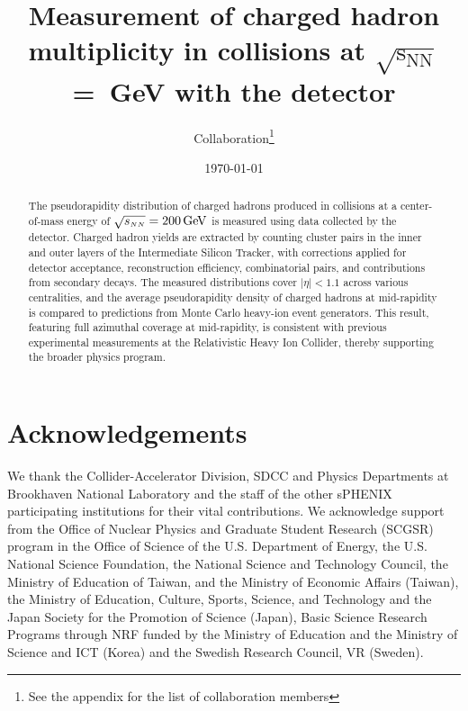 \documentclass[type=preprint,linenumbering=off]{sphenix}
\begin{document}


\title{Measurement of charged hadron multiplicity in \auau collisions at $\sqrt{\text{s}_{\text{NN}}}$\;=~GeV with the \sphenix detector}
\author{\sphenix Collaboration\footnote{See the appendix for the list of collaboration members}}
\date{\today}


\maketitle

\begin{abstract}
  The pseudorapidity distribution of charged hadrons produced in \auau collisions at a center-of-mass energy of $\mbox{$\sqrt{s_{\scriptscriptstyle NN}}$}=200\mathrm{\,Ge\kern -0.1em V}$ is measured using data collected by the \sphenix detector. Charged hadron yields are extracted by counting cluster pairs in the inner and outer layers of the Intermediate Silicon Tracker, with corrections applied for detector acceptance, reconstruction efficiency, combinatorial pairs, and contributions from secondary decays. The measured distributions cover $|\eta|<1.1$ across various centralities, and the average pseudorapidity density of charged hadrons at mid-rapidity is compared to predictions from Monte Carlo heavy-ion event generators. This result, featuring full azimuthal coverage at mid-rapidity, is consistent with previous experimental measurements at the Relativistic Heavy Ion Collider, thereby supporting the broader \sphenix physics program.
\end{abstract}









\section*{Acknowledgements}

We thank the Collider-Accelerator Division, SDCC and Physics
Departments at Brookhaven National Laboratory and the staff of the
other sPHENIX participating institutions for their vital
contributions. We acknowledge support from the Office of Nuclear
Physics and Graduate Student Research (SCGSR) program in the Office of
Science of the U.S. Department of Energy, the U.S. National Science
Foundation, the National Science and Technology Council, the Ministry
of Education of Taiwan, and the Ministry of Economic Affairs (Taiwan),
the Ministry of Education, Culture, Sports, Science, and Technology
and the Japan Society for the Promotion of Science (Japan), Basic
Science Research Programs through NRF funded by the Ministry of
Education and the Ministry of Science and ICT (Korea) and the Swedish
Research Council, VR (Sweden).
\end{document}
